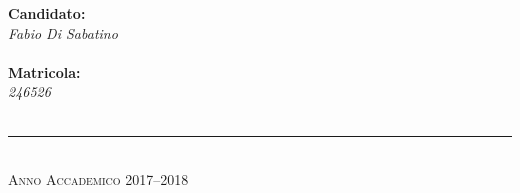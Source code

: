 \begin{titlepage}
\begin{center}
{%
\hspace*{0.1\textwidth}

\begin{minipage}[t]{0.4\textwidth}
\centering
{\bfseries Candidato:} \\
{\itshape Fabio Di Sabatino} \\
\bigskip
\underline{\hspace{\textwidth}}
\\
\bigskip \bigskip
{\bfseries Matricola:} \\
{\itshape 246526} \\
\bigskip
\underline{\hspace{\textwidth}}
\\
\end{minipage}

}

\vfil \vfil \vfil

\rule{\textwidth}{1pt}\\
{\scshape Anno Accademico 2017--2018}

\end{center}

\end{titlepage}

